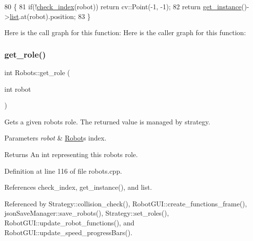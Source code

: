 \begin{DoxyCode}
80                                       \{
81     \textcolor{keywordflow}{if}(!\hyperlink{robots_8hpp_ae3e6ae8f87cdc750c0b99bc609d9ae43}{check\_index}(robot)) \textcolor{keywordflow}{return} cv::Point(-1, -1);
82     \textcolor{keywordflow}{return} \hyperlink{class_robots_a589bce74db5f34af384952d48435168f}{get\_instance}()->\hyperlink{class_robots_a2c6b77265028f82a4342ca1ef15ed305}{list}.at(robot).position;
83 \}
\end{DoxyCode}
Here is the call graph for this function\+:
Here is the caller graph for this function\+:
\mbox{\label{class_robots_ac5cdd16502bd325581fb2d732169a326}} 
\subsubsection{\texorpdfstring{get\+\_\+role()}{get\_role()}}
{\footnotesize\ttfamily int Robots\+::get\+\_\+role (\begin{DoxyParamCaption}\item[{int}]{robot }\end{DoxyParamCaption})\hspace{0.3cm}{\ttfamily [static]}}

Gets a given robot\textquotesingle{}s role. The returned value is managed by strategy. 
\begin{DoxyParams}{Parameters}
{\em robot} & \hyperlink{struct_robots_1_1_robot}{Robot}\textquotesingle{}s index. \\
\hline
\end{DoxyParams}
\begin{DoxyReturn}{Returns}
An int representing this robot\textquotesingle{}s role. 
\end{DoxyReturn}


Definition at line 116 of file robots.\+cpp.



References check\+\_\+index, get\+\_\+instance(), and list.



Referenced by Strategy\+::collision\+\_\+check(), Robot\+G\+U\+I\+::create\+\_\+functions\+\_\+frame(), json\+Save\+Manager\+::save\+\_\+robots(), Strategy\+::set\+\_\+roles(), Robot\+G\+U\+I\+::update\+\_\+robot\+\_\+functions(), and Robot\+G\+U\+I\+::update\+\_\+speed\+\_\+progress\+Bars().



